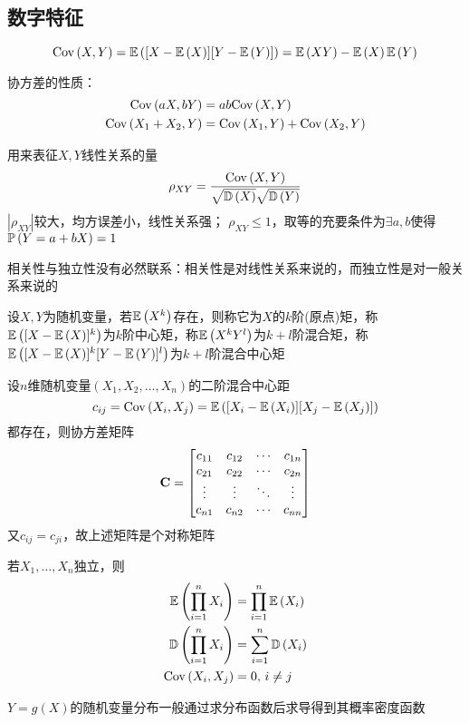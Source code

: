 \subsection{数字特征}
\begin{definition}[协方差]
\[\mathrm{Cov}\left(X,Y\right)=\mathbb{E}\left([X-\mathbb{E}\left(X\right)][Y-\mathbb{E}\left(Y\right)]\right)=\mathbb{E}\left(XY\right)-\mathbb{E}\left(X\right)\mathbb{E}\left(Y\right)\]
\end{definition}
协方差的性质：
\[\begin{aligned}
\mathrm{Cov}\left(aX,bY\right)&=ab\mathrm{Cov}\left(X,Y\right)\\
\mathrm{Cov}\left(X_1+X_2,Y\right)&=\mathrm{Cov}\left(X_1,Y\right)+\mathrm{Cov}\left(X_2,Y\right)
\end{aligned}\]
\begin{definition}[相关系数]
用来表征$X,Y$线性关系的量
\[\rho_{XY}=\frac{\mathrm{Cov}\left(X,Y\right)}{\sqrt{\mathbb{D}\left(X\right)}\sqrt{\mathbb{D}\left(Y\right)}}\]
$|\rho_{XY}|$较大，均方误差小，线性关系强；
$\rho_{XY}\leq 1$，取等的充要条件为$\exists a,b$使得$\mathbb{P}\left(Y=a+bX\right)=1$
\end{definition}
相关性与独立性没有必然联系：相关性是对线性关系来说的，而独立性是对一般关系来说的
\begin{definition}[矩]
设$X,Y$为随机变量，若$\mathbb{E}\left(X^k\right)$存在，则称它为$X$的$k$阶(原点)矩，称$\mathbb{E}\left([X-\mathbb{E}\left(X\right)]^k\right)$为$k$阶中心矩，称$\mathbb{E}\left(X^kY^l\right)$为$k+l$阶混合矩，称$\mathbb{E}\left([X-\mathbb{E}\left(X\right)]^k[Y-\mathbb{E}\left(Y\right)]^l\right)$为$k+l$阶混合中心矩
\end{definition}
\begin{definition}[协方差矩阵]
设$n$维随机变量$(X_1,X_2,\ldots,X_n)$的二阶混合中心距
\[c_{ij}=\mathrm{Cov}\left(X_i,X_j\right)=\mathbb{E}\left([X_i-\mathbb{E}\left(X_i\right)][X_j-\mathbb{E}\left(X_j\right)]\right)\]
都存在，则协方差矩阵
\[\mathbf{C}=\begin{bmatrix}
c_{11}&c_{12}&\cdots&c_{1n}\\
c_{21}&c_{22}&\cdots&c_{2n}\\
\vdots&\vdots&\ddots&\vdots\\
c_{n1}&c_{n2}&\cdots&c_{nn}
\end{bmatrix}\]
又$c_{ij}=c_{ji}$，故上述矩阵是个对称矩阵
\end{definition}
\begin{theorem}
若$X_1,\ldots,X_n$独立，则
\[\begin{aligned}
\mathbb{E}\left(\prod_{i=1}^nX_i\right)&=\prod_{i=1}^n\mathbb{E}\left(X_i\right)\\
\mathbb{D}\left(\prod_{i=1}^nX_i\right)&=\sum_{i=1}^n\mathbb{D}\left(X_i\right)\\
\mathrm{Cov}\left(X_i,X_j\right)&=0,\,i\ne j
\end{aligned}\]
\end{theorem}
$Y=g(X)$的随机变量分布一般通过求分布函数后求导得到其概率密度函数